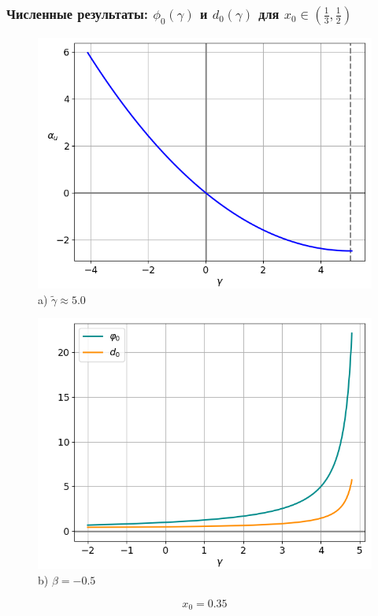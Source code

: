 \documentclass[fullscreen=true, unicode, bookmarks=false]{beamer}
\begin{document}
\begin{frame}
\frametitle{ Численные результаты: $ \phi_0(\gamma) $ и $ d_0(\gamma) $ для $ x_0 \in \left( \frac{1}{3}, \frac{1}{2} \right) $ }

\begin{figure} 
\begin{minipage}[h]{0.49\linewidth}
\begin{center}
\includegraphics[scale=0.38]{x0=0,35.png} \\ {\scriptsize a) $ \widetilde{\gamma} \approx 5.0 $}
\end{center}
\end{minipage} 
\hfill
\begin{minipage}[h]{0.49\linewidth}
\begin{center}
\includegraphics[scale=0.38]{divergent_phi0d0_x0=0,35,beta=0,5_before.png}  \\ {\scriptsize b) $ \beta = -0.5 $}
\end{center}
\end{minipage} 
\end{figure}

$$ x_0 = 0.35 $$

\end{frame}
\end{document}
